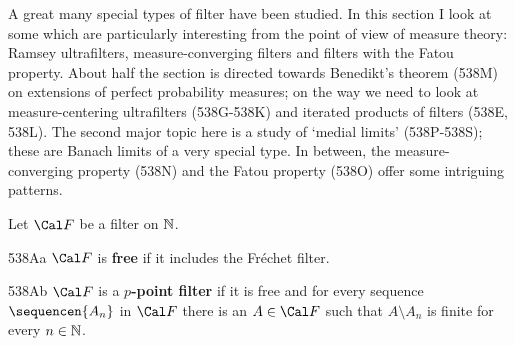 
\def\chaptername{Topologies and Measures III}
\def\sectionname{Filters and limits}

\def\FS{\mathop{\text{FS}}\nolimits}


A great many special types of filter have been studied.   In this section I
look at some which are particularly interesting from the point of view of
measure theory:  Ramsey ultrafilters, measure-converging filters and
filters with the Fatou property.   About half the section is directed
towards Benedikt's theorem (538M) on extensions of perfect probability
measures;  on the way we need to look at
measure-centering ultrafilters (538G-538K) %
and iterated
products of filters (538E, 538L).   The second major topic here is a study
of `medial limits' (538P-538S); %
these are Banach limits of a very special type.
In between, the measure-converging property (538N)
and the Fatou property (538O) offer some intriguing patterns.


Let $\Cal F$ be a filter on $\Bbb N$.

\spheader 538Aa $\Cal F$ is {\bf free} if it includes the Fr\'echet filter.

\spheader 538Ab $\Cal F$ is a {\bf $p$-point filter} if it is free and
for every sequence
$\sequencen{A_n}$ in $\Cal F$ there is an $A\in\Cal F$ such that
$A\setminus A_n$ is finite for every $n\in\Bbb N$.

